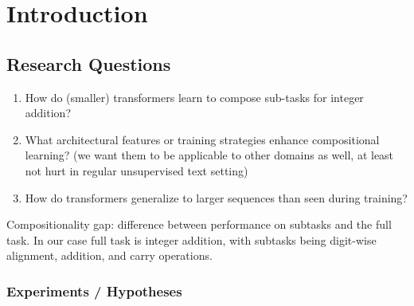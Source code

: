 \chapter{Introduction}\label{introduction}


\section*{Research Questions}

\begin{enumerate}
    \item How do (smaller) transformers learn to compose sub-tasks for integer addition?
    \item What architectural features or training strategies enhance compositional learning? (we want them to be applicable to other domains as well, at least not hurt in regular unsupervised text setting)
    \item How do transformers generalize to larger sequences than seen during training?
\end{enumerate}

Compositionality gap: difference between performance on subtasks and the full task. In our case full task is integer addition, with subtasks being digit-wise alignment, addition, and carry operations.

\subsection*{Experiments / Hypotheses}

